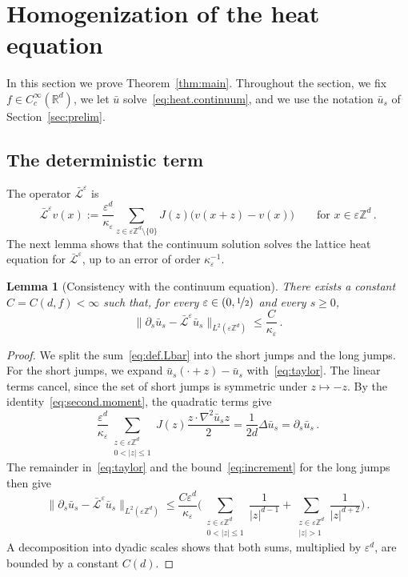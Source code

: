 \documentclass[11pt]{amsart}
\newtheorem{lemma}[theorem]{Lemma}
\numberwithin{equation}{section}
\newcommand{\Z}{\mathbb{Z}}
\newcommand{\R}{\mathbb{R}}
\newcommand{\eps}{\varepsilon}
\newcommand{\Lbar}{\bar{\mathcal{L}}^\varepsilon}
\newcommand{\nf}{\nicefrac}
\begin{document}
\section{Homogenization of the heat equation} \label{sec:proof}

In this section we prove Theorem~\ref{thm:main}.
Throughout the section, we fix $f \in C^\infty_c(\R^d)$, we let $\bar u$ solve~\eqref{eq:heat.continuum}, and we use the notation $\bar u_s$ of Section~\ref{sec:prelim}.

\subsection{The deterministic term} \label{sec:mean}

The operator $\Lbar$ is
\begin{equation} \label{eq:def.Lbar}
    \Lbar v(x) := \frac{\eps^d}{\kappa_\eps} \sum_{z \in \eps \Z^d \setminus \{0\}} J(z) \bigl( v(x + z) - v(x) \bigr) \qquad \text{for } x \in \eps \Z^d\,.
\end{equation}
The next lemma shows that the continuum solution solves the lattice heat equation for $\Lbar$, up to an error of order $\kappa_\eps^{-1}$.

\begin{lemma}[Consistency with the continuum equation] \label{lem:mean}
There exists a constant $C = C(d, f) < \infty$ such that, for every $\eps \in (0, \nf12)$ and every $s \geq 0$,
\begin{equation*}
    \bigl\| \partial_s \bar u_s - \Lbar \bar u_s \bigr\|_{L^2(\eps \Z^d)} \leq \frac{C}{\kappa_\eps}\,.
\end{equation*}
\end{lemma}

\begin{proof}
We split the sum~\eqref{eq:def.Lbar} into the short jumps and the long jumps.
For the short jumps, we expand $\bar u_s(\cdot + z) - \bar u_s$ with~\eqref{eq:taylor}.
The linear terms cancel, since the set of short jumps is symmetric under $z \mapsto -z$.
By the identity~\eqref{eq:second.moment}, the quadratic terms give
\begin{equation*}
    \frac{\eps^d}{\kappa_\eps} \sum_{\substack{z \in \eps \Z^d \\ 0 < |z| \leq 1}} J(z) \frac{z \cdot \nabla^2 \bar u_s z}{2} = \frac{1}{2d} \Delta \bar u_s = \partial_s \bar u_s\,.
\end{equation*}
The remainder in~\eqref{eq:taylor} and the bound~\eqref{eq:increment} for the long jumps then give
\begin{equation*}
    \bigl\| \partial_s \bar u_s - \Lbar \bar u_s \bigr\|_{L^2(\eps \Z^d)} \leq \frac{C \eps^d}{\kappa_\eps} \Biggl( \sum_{\substack{z \in \eps \Z^d \\ 0 < |z| \leq 1}} \frac{1}{|z|^{d-1}} + \sum_{\substack{z \in \eps \Z^d \\ |z| > 1}} \frac{1}{|z|^{d+2}} \Biggr)\,.
\end{equation*}
A decomposition into dyadic scales shows that both sums, multiplied by $\eps^d$, are bounded by a constant $C(d)$.
\end{proof}
\end{document}

